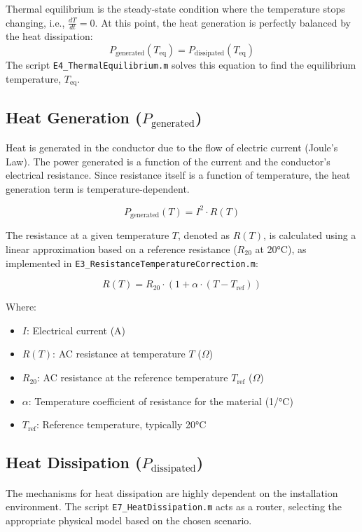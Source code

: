 \documentclass[12pt, a4paper]{article}
\begin{document}
Thermal equilibrium is the steady-state condition where the temperature stops changing, i.e., $\frac{dT}{dt} = 0$. At this point, the heat generation is perfectly balanced by the heat dissipation:
\begin{equation}
P_{\text{generated}}(T_{\text{eq}}) = P_{\text{dissipated}}(T_{\text{eq}})
\label{eq:equilibrium}
\end{equation}
The script \texttt{E4\_ThermalEquilibrium.m} solves this equation to find the equilibrium temperature, $T_{\text{eq}}$.

\subsection{Heat Generation ($P_{\text{generated}}$)}
Heat is generated in the conductor due to the flow of electric current (Joule's Law). The power generated is a function of the current and the conductor's electrical resistance. Since resistance itself is a function of temperature, the heat generation term is temperature-dependent.

\begin{equation}
P_{\text{generated}}(T) = I^2 \cdot R(T)
\end{equation}

The resistance at a given temperature $T$, denoted as $R(T)$, is calculated using a linear approximation based on a reference resistance ($R_{20}$ at 20°C), as implemented in \texttt{E3\_ResistanceTemperatureCorrection.m}:

\begin{equation}
R(T) = R_{20} \cdot (1 + \alpha \cdot (T - T_{\text{ref}}))
\end{equation}

Where:
\begin{itemize}
    \item $I$: Electrical current (A)
    \item $R(T)$: AC resistance at temperature $T$ ($\Omega$)
    \item $R_{20}$: AC resistance at the reference temperature $T_{\text{ref}}$ ($\Omega$)
    \item $\alpha$: Temperature coefficient of resistance for the material (1/°C)
    \item $T_{\text{ref}}$: Reference temperature, typically 20°C
\end{itemize}

\subsection{Heat Dissipation ($P_{\text{dissipated}}$)}
The mechanisms for heat dissipation are highly dependent on the installation environment. The script \texttt{E7\_HeatDissipation.m} acts as a router, selecting the appropriate physical model based on the chosen scenario.
\end{document}
